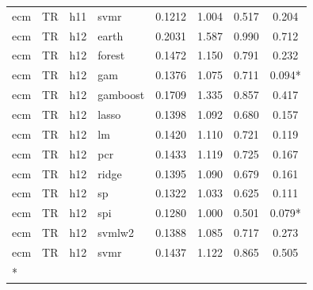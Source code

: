 \begin{ThreePartTable}
\begin{longtable}[t]{llclcccc}
ecm & TR & h11 & svmr & 0.1212 & 1.004 & 0.517 & 0.204\\
\addlinespace
ecm & TR & h12 & earth & 0.2031 & 1.587 & 0.990 & 0.712\\
ecm & TR & h12 & forest & 0.1472 & 1.150 & 0.791 & 0.232\\
ecm & TR & h12 & gam & 0.1376 & 1.075 & 0.711 & 0.094*\\
ecm & TR & h12 & gamboost & 0.1709 & 1.335 & 0.857 & 0.417\\
ecm & TR & h12 & lasso & 0.1398 & 1.092 & 0.680 & 0.157\\
ecm & TR & h12 & lm & 0.1420 & 1.110 & 0.721 & 0.119\\
ecm & TR & h12 & pcr & 0.1433 & 1.119 & 0.725 & 0.167\\
ecm & TR & h12 & ridge & 0.1395 & 1.090 & 0.679 & 0.161\\
ecm & TR & h12 & sp & 0.1322 & 1.033 & 0.625 & 0.111\\
ecm & TR & h12 & spi & 0.1280 & 1.000 & 0.501 & 0.079*\\
ecm & TR & h12 & svmlw2 & 0.1388 & 1.085 & 0.717 & 0.273\\
ecm & TR & h12 & svmr & 0.1437 & 1.122 & 0.865 & 0.505\\*
\end{longtable}
\end{ThreePartTable}
\endgroup{}
